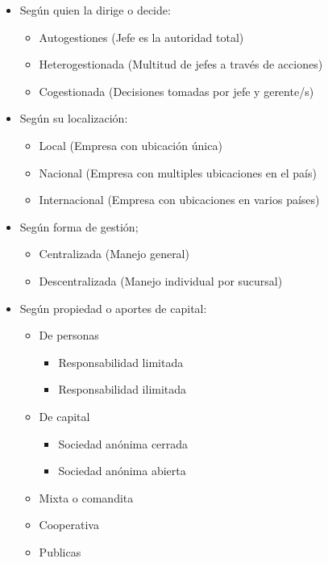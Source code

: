 \documentclass{templateNote}
\begin{document}
\begin{itemize}
    \item Según quien la dirige o decide:
        \begin{itemize}
            \item Autogestiones (Jefe es la autoridad total)
            \item Heterogestionada (Multitud de jefes a través de acciones)
            \item Cogestionada (Decisiones tomadas por jefe y gerente/s)
        \end{itemize}
    \item Según su localización:
        \begin{itemize}
            \item Local (Empresa con ubicación única)
            \item Nacional (Empresa con multiples ubicaciones en el país)
            \item Internacional (Empresa con ubicaciones en varios países)
        \end{itemize}
    \item Según forma de gestión;
        \begin{itemize}
            \item Centralizada (Manejo general)
            \item Descentralizada (Manejo individual por sucursal)
        \end{itemize}
    \item Según propiedad o aportes de capital:
        \begin{itemize}
            \item De personas
                \begin{itemize}
                    \item Responsabilidad limitada
                    \item Responsabilidad ilimitada
                \end{itemize}
            \item De capital
                \begin{itemize}
                    \item Sociedad anónima cerrada
                    \item Sociedad anónima abierta
                \end{itemize}
            \item Mixta o comandita
            \item Cooperativa
            \item Publicas

\end{itemize}
\end{itemize}
\end{document}
